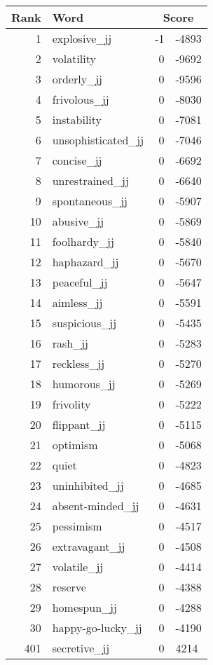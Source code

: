\begin{longtable}[!htbp]{| rlr@{.}l |}
    \hline
    \textbf{Rank} & \textbf{Word} & \multicolumn{2}{c|}{\textbf{Score}} \\
    \hline
    \endhead
    1 & explosive\_jj & -1 & -4893 \\
    2 & volatility & 0 & -9692 \\
    3 & orderly\_jj & 0 & -9596 \\
    4 & frivolous\_jj & 0 & -8030 \\
    5 & instability & 0 & -7081 \\
    6 & unsophisticated\_jj & 0 & -7046 \\
    7 & concise\_jj & 0 & -6692 \\
    8 & unrestrained\_jj & 0 & -6640 \\
    9 & spontaneous\_jj & 0 & -5907 \\
    10 & abusive\_jj & 0 & -5869 \\
    11 & foolhardy\_jj & 0 & -5840 \\
    12 & haphazard\_jj & 0 & -5670 \\
    13 & peaceful\_jj & 0 & -5647 \\
    14 & aimless\_jj & 0 & -5591 \\
    15 & suspicious\_jj & 0 & -5435 \\
    16 & rash\_jj & 0 & -5283 \\
    17 & reckless\_jj & 0 & -5270 \\
    18 & humorous\_jj & 0 & -5269 \\
    19 & frivolity & 0 & -5222 \\
    20 & flippant\_jj & 0 & -5115 \\
    21 & optimism & 0 & -5068 \\
    22 & quiet & 0 & -4823 \\
    23 & uninhibited\_jj & 0 & -4685 \\
    24 & absent-minded\_jj & 0 & -4631 \\
    25 & pessimism & 0 & -4517 \\
    26 & extravagant\_jj & 0 & -4508 \\
    27 & volatile\_jj & 0 & -4414 \\
    28 & reserve & 0 & -4388 \\
    29 & homespun\_jj & 0 & -4288 \\
    30 & happy-go-lucky\_jj & 0 & -4190 \\
    401 & secretive\_jj & 0 & 4214 \\

\end{longtable}
